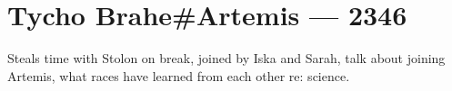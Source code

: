 \hypertarget{tycho-braheartemis-2346}{%
\chapter{Tycho Brahe\#Artemis — 2346}\label{tycho-braheartemis-2346}}

Steals time with Stolon on break, joined by Iska and Sarah, talk about joining Artemis, what races have learned from each other re: science.
